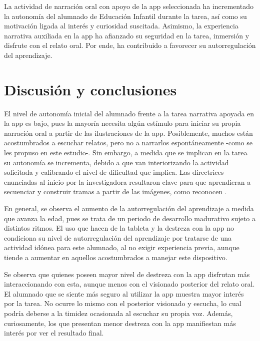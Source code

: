 \documentclass[spanish]{textolivre}
\begin{document}
La actividad de narración oral con apoyo de la app seleccionada ha incrementado la autonomía del alumnado de Educación Infantil durante la tarea, así como su motivación ligada al interés y curiosidad suscitada. Asimismo, la experiencia narrativa auxiliada en la app ha afianzado su seguridad en la tarea, inmersión y disfrute con el relato oral. Por ende, ha contribuido a favorecer su autorregulación del aprendizaje.

\section{Discusión y conclusiones}

El nivel de autonomía inicial del alumnado frente a la tarea narrativa apoyada en la app es bajo, pues la mayoría necesita algún estímulo para iniciar su propia narración oral a partir de las ilustraciones de la app. Posiblemente, muchos están acostumbrados a escuchar relatos, pero no a narrarlos espontáneamente -como se les propuso en este estudio-. Sin embargo, a medida que se implican en la tarea su autonomía se incrementa, debido a que van interiorizando la actividad solicitada y calibrando el nivel de dificultad que implica. Las directrices enunciadas al inicio por la investigadora resultaron clave para que aprendieran a secuenciar y construir tramas a partir de las imágenes, como reconocen \textcite{torremocha_libros_2002}.

En general, se observa el aumento de la autorregulación del aprendizaje a medida que avanza la edad, pues se trata de un periodo de desarrollo madurativo sujeto a distintos ritmos. El uso que hacen de la tableta y la destreza con la app no condiciona su nivel de autorregulación del aprendizaje por tratarse de una actividad idónea para este alumnado, al no exigir experiencia previa, aunque tiende a aumentar en aquellos acostumbrados a manejar este dispositivo.

Se observa que quienes poseen mayor nivel de destreza con la app disfrutan más interaccionando con esta, aunque menos con el visionado posterior del relato oral. El alumnado que se siente más seguro al utilizar la app muestra mayor interés por la tarea. No ocurre lo mismo con el posterior visionado y escucha, lo cual podría deberse a la timidez ocasionada al escuchar su propia voz. Además, curiosamente, los que presentan menor destreza con la app manifiestan más interés por ver el resultado final.
\end{document}
